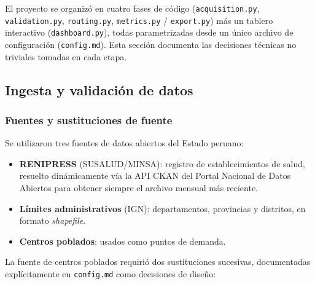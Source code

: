 \documentclass[11pt]{article}
\begin{document}
El proyecto se organizó en cuatro fases de código (\texttt{acquisition.py},
\texttt{validation.py}, \texttt{routing.py}, \texttt{metrics.py} /
\texttt{export.py}) más un tablero interactivo (\texttt{dashboard.py}), todas
parametrizadas desde un único archivo de configuración
(\texttt{config.md}). Esta sección documenta las decisiones técnicas no
triviales tomadas en cada etapa.

\subsection{Ingesta y validación de datos}

\subsubsection{Fuentes y sustituciones de fuente}

Se utilizaron tres fuentes de datos abiertos del Estado peruano:

\begin{itemize}
  \item \textbf{RENIPRESS} (SUSALUD/MINSA): registro de establecimientos de
    salud, resuelto dinámicamente vía la API CKAN del Portal Nacional de
    Datos Abiertos para obtener siempre el archivo mensual más reciente.
  \item \textbf{Límites administrativos} (IGN): departamentos, provincias y
    distritos, en formato \textit{shapefile}.
  \item \textbf{Centros poblados}: usados como puntos de demanda.
\end{itemize}

La fuente de centros poblados requirió dos sustituciones sucesivas,
documentadas explícitamente en \texttt{config.md} como decisiones de
diseño:
\end{document}

